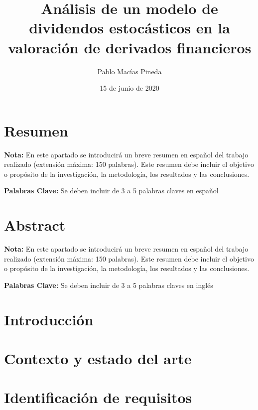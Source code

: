 \documentclass[11pt,a4paper,spanish]{book}
\title{Análisis de un modelo de dividendos estocásticos en la valoración de derivados financieros}
\author{Pablo Macías Pineda}
\date{15 de junio de 2020}
\begin{document}
\renewcommand{\listfigurename}{Índice de Ilustraciones}
\renewcommand{\listtablename}{Índice de Tablas}
\renewcommand{\contentsname}{Índice de Contenidos}
\renewcommand{\figurename}{Figura}
\renewcommand{\tablename}{Tabla} 

\maketitle

\frontmatter
\tableofcontents
\listoffigures
\listoftables

\chapter{Resumen}
{\bf Nota:} En este apartado se introducirá un breve resumen en español del trabajo realizado (extensión máxima: 150 palabras). Este resumen debe incluir el objetivo o propósito de la investigación, la metodología, los resultados y las conclusiones.


{\bf Palabras Clave:} Se deben incluir de 3 a 5 palabras claves en español

\chapter{Abstract}
{\bf Nota:} En este apartado se introducirá un breve resumen en español del trabajo realizado (extensión máxima: 150 palabras). Este resumen debe incluir el objetivo o propósito de la investigación, la metodología, los resultados y las conclusiones.


{\bf Palabras Clave:} Se deben incluir de 3 a 5 palabras claves en inglés


\mainmatter

\chapter{Introducción}

\cleardoublepage

\chapter{Contexto y estado del arte}

\cleardoublepage

\chapter{Identificación de requisitos}

\cleardoublepage
\end{document}
